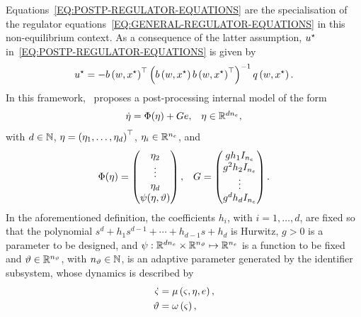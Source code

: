 Equations~\eqref{EQ:POSTP-REGULATOR-EQUATIONS} are the specialisation of the regulator equations~\eqref{EQ:GENERAL-REGULATOR-EQUATIONS}
in this non-equilibrium context. As a consequence of the latter assumption, $u^{\star}$ in~\eqref{EQ:POSTP-REGULATOR-EQUATIONS} is given by
\begin{equation*}
   u^{\star} = - b \left( w, x^{\star} \right)^{\top} \left( b \left( w, x^{\star} \right) b \left( w, x^{\star} \right)^{\top} \right)^{-1} q \left( w, x^{\star} \right).
\end{equation*}
In this framework,~\cite{bin2019class} proposes a post-processing internal model of the form
\begin{equation*}%
   \begin{matrix}
      \dot{\im} = \imfun(\im) + Ge, & \im \in \R^{d \dd{\ee}},
   \end{matrix}
\end{equation*}
with $d \in \mathbb{N}$, $\eta = \left( \eta_1, \dots, \eta_d \right)^{\top}$, $\eta_i \in \mathbb{R}^{n_{e}}$, and
\begin{equation}%
   \label{EQ:POSTP-INTERNAL-MODEL}
   \begin{matrix}
      \Phi(\im) = 
      \begin{pmatrix}
         \im_2 \\ \vdots \\ \im_d \\ \imfunsingle(\im, \param)
      \end{pmatrix}, &
      G =
      \begin{pmatrix}
         g h_1 I_{\dd{\ee}} \\ g^2 h_2 I_{\dd{\ee}} \\ \vdots \\ g^d h_d I_{\dd{\ee}}
      \end{pmatrix}.
   \end{matrix}
\end{equation}
In the aforementioned definition, the coefficients $h_i$, with $i = 1, \dots, d$, are fixed so that the polynomial
$s^d + h_1s^{d-1}+\cdots+h_{d-1}s+h_d$ is Hurwitz, $g > 0$ is a parameter to be designed, and
$\psi: \mathbb{R}^{d n_{e}} \times \mathbb{R}^{n_{\vartheta}} \mapsto \mathbb{R}^{n_{e}}$ is a function to be fixed and $\vartheta \in \mathbb{R}^{n_{\vartheta}}$,
with $n_{\vartheta} \in \mathbb{N}$, is an adaptive parameter generated by the identifier subsystem, whose dynamics is described by
\begin{equation}
    \begin{split}%
      \label{EQ:POSTP-GENERAL-IDENTIFIER}
      \dot{\id} & = \idfun \lp \id, \im, \ee \rp, \\
      \param & = \idout \lp \id \rp,
    \end{split}
\end{equation}
